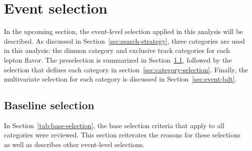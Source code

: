 \clearpage
\section{Event selection}
\label{sec:event-selection}

In the upcoming section, the event-level selection applied in this analysis will be described. As discussed in Section~\ref{sec:search-strategy}, three categories are used in this analysis: the dimuon category and exclusive track categories for each lepton flavor. The preselection is summarized in Section~\ref{sec:preselection}, followed by the selection that defines each category in section~\ref{sec:category-selection}. Finally, the multivariate selection for each category is discussed in Section~\ref{sec:event-bdt}.

\subsection{Baseline selection}
\label{sec:preselection}

In Section~\ref{tab:base-selection}, the base selection criteria that apply to all categories were reviewed. This section reiterates the reasons for these selections as well as describes other event-level selections.

